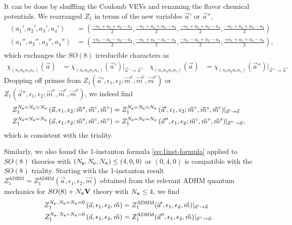 \documentclass[letterpaper, 11pt]{article}
\begin{document}
{It can be done by shuffling the Coulomb VEVs and renaming the flavor chemical potentials. We rearranged $Z_1$ in terms of the new variables $\vec{a}'$ or $\vec{a}''$, 
\begin{align}
  \label{eq:so8-triality}
  \begin{split}
  (a_1',a_2',a_3',a_4') &= \textstyle(\frac{-a_1+a_2+a_3-a_4}{2},\frac{-a_1+a_2+a_3-a_4}{2},\frac{-a_1+a_2+a_3-a_4}{2},\frac{-a_1+a_2+a_3-a_4}{2}) \\
  (a_1'',a_2'',a_3'',a_4'') &= \textstyle(\frac{+a_1-a_2-a_3-a_4}{2},\frac{-a_1+a_2-a_3-a_4}{2},\frac{-a_1-a_2+a_3-a_4}{2},\frac{+a_1+a_2+a_3-a_4}{2}),
  \end{split}
\end{align}
which exchanges the $SO(8)$ irreducible characters as
\begin{align}
  \chi_{(n_cn_an_sn_v)} (\vec{a}) &= \chi_{(n_vn_an_cn_s)} (\vec{a}')|_{\vec{a}' \rightarrow \vec{a}}, &
  \chi_{(n_sn_an_vn_c)} (\vec{a}) &= \chi_{(n_vn_an_cn_s)} (\vec{a}'')|_{\vec{a}'' \rightarrow \vec{a}}.
\end{align}
Dropping off primes from $Z_1 (\vec{a}', \epsilon_1,\epsilon_2; \vec{m}^s,\vec{m}^c,\vec{m}^v)$ or $Z_1 (\vec{a}'', \epsilon_1,\epsilon_2;\vec{m}^s,\vec{m}^c,\vec{m}^v) $, we indeed find
\begin{align}
  \begin{split}
  Z_1^{N_{\bf s}=N_{\bf c}= N_{\bf v}}\,(\vec{a}, \epsilon_1,\epsilon_2;\vec{m}^s,\vec{m}^c,\vec{m}^v) &= Z_1^{N_{\bf s}=N_{\bf c}= N_{\bf v}}\,(\vec{a}', \epsilon_1,\epsilon_2;\vec{m}^v,\vec{m}^s,\vec{m}^c)|_{\vec{a}' \rightarrow \vec{a}}\\
  Z_1^{N_{\bf s}=N_{\bf c}= N_{\bf v}}\,(\vec{a}, \epsilon_1,\epsilon_2;\vec{m}^s,\vec{m}^c,\vec{m}^v) &= Z_1^{N_{\bf s}=N_{\bf c}= N_{\bf v}}\,(\vec{a}'', \epsilon_1,\epsilon_2;\vec{m}^c,\vec{m}^v,\vec{m}^s)|_{\vec{a}'' \rightarrow \vec{a}} , 
  \end{split}
\end{align}
which is consistent with the triality. 

Similarly, we also found the 1-instanton formula \eqref{eq:1inst-formula} applied to $SO(8)$ theories with $( N_{\bf s},  N_{\bf c}, N_{\bf v}) \leq (4,0,0)$ or $(0,4,0)$ is compatible with the $SO(8)$ triality.
Starting with the 1-instanton result $Z_1^\text{ADHM} = Z_1^\text{ADHM} (\vec{a}, \epsilon_1,\epsilon_2, \vec{m}) $ obtained from the relevant ADHM quantum mechanics for $SO(8) +  N_{\bf v}\mathbf{V}$ theory with $ N_{\bf v} \leq 4$, we find 
\begin{align}
  \begin{split}
  Z_1^{N_{\bf c}, \, N_{\bf c}= N_{\bf v}= 0}\,(\vec{a}, \epsilon_1,\epsilon_2, \vec{m}) &= Z_1^{\text{ADHM}}(\vec{a}', \epsilon_1,\epsilon_2, \vec{m})|_{\vec{a}' \rightarrow \vec{a}}\\
  Z_1^{N_{\bf s}, \, N_{\bf s}= N_{\bf v}= 0}\,(\vec{a}, \epsilon_1,\epsilon_2, \vec{m}) &= Z_1^{\text{ADHM}}(\vec{a}'', \epsilon_1,\epsilon_2, \vec{m})|_{\vec{a}'' \rightarrow \vec{a}}.
  \end{split}
\end{align}


}
\end{document}
